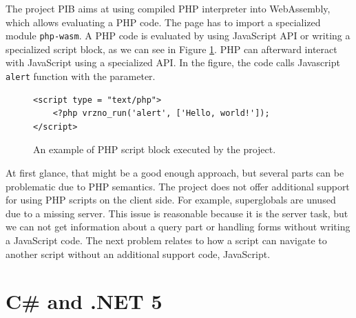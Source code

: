 The project PIB \cite{online:pib} aims at using compiled PHP interpreter into WebAssembly, which allows evaluating a PHP code.
The page has to import a specialized module \texttt{php-wasm}. 
A PHP code is evaluated by using JavaScript API or writing a specialized script block, as we can see in Figure \ref{img03:vrzno}.
PHP can afterward interact with JavaScript using a specialized API.
In the figure, the code calls Javascript \texttt{alert} function with the parameter.
\par
\begin{figure}[t!]
\begin{lstlisting}
<script type = "text/php">
	<?php vrzno_run('alert', ['Hello, world!']);
</script>
\end{lstlisting}
\caption{An example of PHP script block executed by the project.}
\label{img03:vrzno}
\end{figure}
\par
At first glance, that might be a good enough approach, but several parts can be problematic due to PHP semantics.
The project does not offer additional support for using PHP scripts on the client side.
For example, superglobals are unused due to a missing server.
This issue is reasonable because it is the server task, but we can not get information about a query part or handling forms without writing a JavaScript code.
The next problem relates to how a script can navigate to another script without an additional support code, JavaScript.

\section{C\# and .NET 5}

